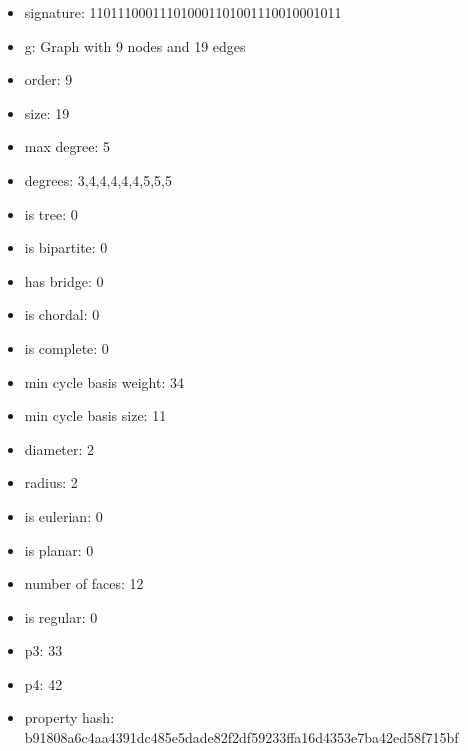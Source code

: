 \newpage
\begin{figure}
\end{figure}
\begin{itemize}
\item signature: 110111000111010001101001110010001011
\item g: Graph with 9 nodes and 19 edges
\item order: 9
\item size: 19
\item max degree: 5
\item degrees: 3,4,4,4,4,4,5,5,5
\item is tree: 0
\item is bipartite: 0
\item has bridge: 0
\item is chordal: 0
\item is complete: 0
\item min cycle basis weight: 34
\item min cycle basis size: 11
\item diameter: 2
\item radius: 2
\item is eulerian: 0
\item is planar: 0
\item number of faces: 12
\item is regular: 0
\item p3: 33
\item p4: 42
\item property hash: b91808a6c4aa4391dc485e5dade82f2df59233ffa16d4353e7ba42ed58f715bf
\end{itemize}
